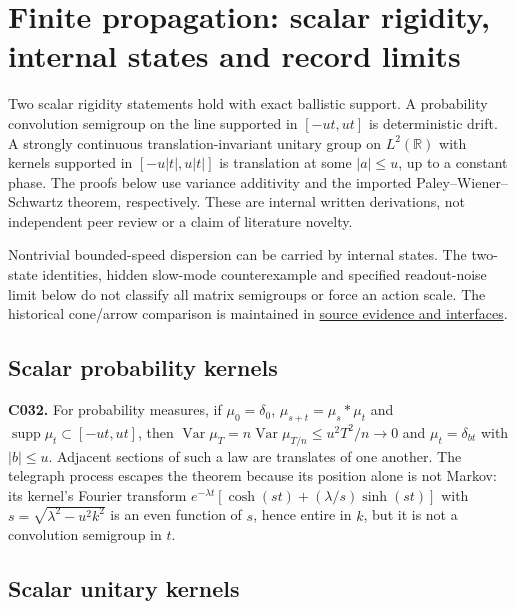 \documentclass[11pt,a4paper]{article}
\begin{document}
\hypertarget{finite-propagation-scalar-rigidity-internal-states-and-record-limits}{%
\section{Finite propagation: scalar rigidity, internal states and record
limits}\label{finite-propagation-scalar-rigidity-internal-states-and-record-limits}}

Two scalar rigidity statements hold with exact ballistic support. A
probability convolution semigroup on the line supported in \([-ut,ut]\)
is deterministic drift. A strongly continuous translation-invariant
unitary group on \(L^2(\mathbb R)\) with kernels supported in
\([-u|t|,u|t|]\) is translation at some \(|a|\le u\), up to a constant
phase. The proofs below use variance additivity and the imported
Paley--Wiener--Schwartz theorem, respectively. These are internal
written derivations, not independent peer review or a claim of
literature novelty.

Nontrivial bounded-speed dispersion can be carried by internal states.
The two-state identities, hidden slow-mode counterexample and specified
readout-noise limit below do not classify all matrix semigroups or force
an action scale. The historical cone/arrow comparison is maintained in
\href{ancient-cuts-provenance.md}{source evidence and interfaces}.

\hypertarget{scalar-probability-kernels}{%
\subsection{Scalar probability
kernels}\label{scalar-probability-kernels}}

\textbf{C032.} For probability measures, if \(\mu_0=\delta_0\),
\(\mu_{s+t}=\mu_s*\mu_t\) and
\(\operatorname{supp}\mu_t\subset[-ut,ut]\), then
\(\operatorname{Var}\mu_T=n\operatorname{Var}\mu_{T/n}\le u^2T^2/n\to0\)
and \(\mu_t=\delta_{bt}\) with \(|b|\le u\). Adjacent sections of such a
law are translates of one another. The telegraph process escapes the
theorem because its position alone is not Markov: its kernel's Fourier
transform \(e^{-\lambda t}[\cosh(st)+(\lambda/s)\sinh(st)]\) with
\(s=\sqrt{\lambda^2-u^2k^2}\) is an even function of \(s\), hence entire
in \(k\), but it is not a convolution semigroup in \(t\).

\hypertarget{scalar-unitary-kernels}{%
\subsection{Scalar unitary kernels}\label{scalar-unitary-kernels}}
\end{document}
